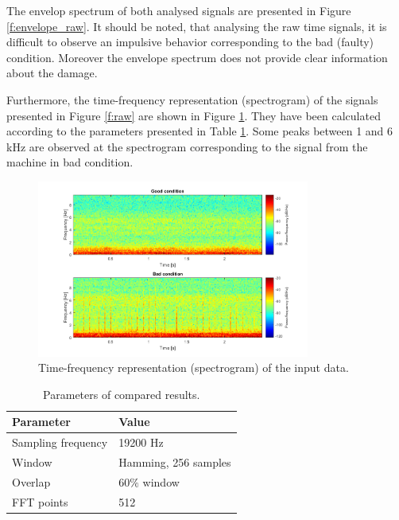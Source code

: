 \documentclass[11pt]{article}
\begin{document}
The envelop spectrum of both analysed signals are presented in Figure \ref{f:envelope_raw}. It should be noted, that analysing the raw time signals, it is difficult to observe an impulsive behavior corresponding to the bad (faulty) condition. Moreover the envelope spectrum does not provide clear information about the damage. 

Furthermore, the time-frequency representation (spectrogram) of the signals presented in Figure \ref{f:raw} are shown in Figure \ref{f:spec1}. They have been calculated according to the parameters presented in Table \ref{tab:tab}. 
Some peaks between 1 and 6 kHz are observed at the spectrogram corresponding to the signal from the machine in bad condition. 

\begin{figure}[!ht]
\begin{center}
\includegraphics[width=0.8\textwidth]{spec.png}
\caption{Time-frequency representation (spectrogram) of the input data. \label{f:spec1}}
\end{center}
\end{figure}

\begin{table}[ht!]
    \centering
    \caption{Parameters of compared results.}
  \begin{tabular}{|l|l|}
    \hline
    \textbf{Parameter} & \textbf{Value} \\ \hline
         Sampling frequency & 19200 Hz \\ \hline
         Window & Hamming, 256 samples \\ \hline
         Overlap & $60\%$ window \\ \hline
         FFT points & 512 \\
    \hline
    \end{tabular}
    \label{tab:tab}
\end{table}
\end{document}
